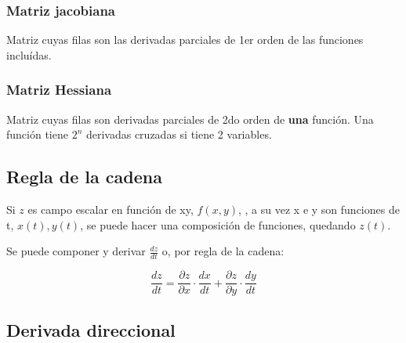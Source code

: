\subsubsection{Matriz jacobiana}

Matriz cuyas filas son las derivadas parciales de 1er orden de las funciones incluídas.

\subsubsection{Matriz Hessiana}

Matriz cuyas filas son derivadas parciales de 2do orden de \textbf{una} función.
Una función tiene \(2^{n}\) derivadas cruzadas si tiene 2 variables.

\subsection{Regla de la cadena}

Si \(z\) es campo escalar en función de xy, \(f(x,y)\),
, a su vez x e y son funciones de t, \(x(t), y(t)\),
se puede hacer una composición de funciones, quedando \(z(t)\).

Se puede componer y derivar \(\frac{dz}{dt}\) o, por regla de la cadena:

\begin{equation*}
    \frac{dz}{dt} = \frac{\partial z}{\partial x}\cdot\frac{dx}{dt} + \frac{\partial z}{\partial y}\cdot\frac{dy}{dt}
\end{equation*}

\subsection{Derivada direccional}

